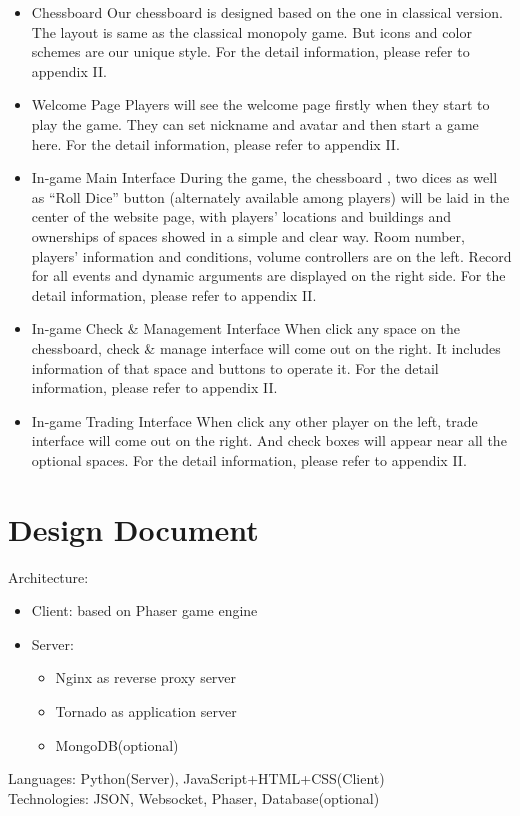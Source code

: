 \documentclass[a4paper,12pt]{article}
\begin{document}
\begin{itemize}
\item Chessboard
	Our chessboard is designed based on the one in classical version. The layout is same as the classical monopoly game. But icons and color schemes are our unique style. For the detail information, please refer to appendix II. 

\item Welcome Page
	Players will see the welcome page firstly when they start to play the game. They can set nickname and avatar and then start a game here. For the detail information, please refer to appendix II. 

\item In-game Main Interface
	During the game, the chessboard , two dices as well as “Roll Dice” button (alternately available among players) will be laid in the center of the website page, with players’ locations and buildings and ownerships of spaces showed in a simple and clear way. Room number, players’ information and conditions, volume controllers are on the left. Record for all events and dynamic arguments are displayed on the right side. For the detail information, please refer to appendix II.

\item In-game Check \& Management Interface
	When click any space on the chessboard, check \& manage interface will come out on the right. It includes information of that space and buttons to operate it. For the detail information, please refer to appendix II.

\item In-game Trading Interface
	When click any other player on the left, trade interface will come out on the right. And check boxes will appear near all the optional spaces. For the detail information, please refer to appendix II.
\end{itemize}

\section{Design Document}
Architecture: 
\begin{itemize}
\item Client: based on Phaser game engine
\item Server:
	\begin{itemize}
		\item Nginx as reverse proxy server
		\item Tornado as application server
		\item MongoDB(optional)
	\end{itemize}
\end{itemize}
Languages: Python(Server), JavaScript+HTML+CSS(Client)
\\
Technologies: JSON, Websocket, Phaser, Database(optional)
\end{document}
